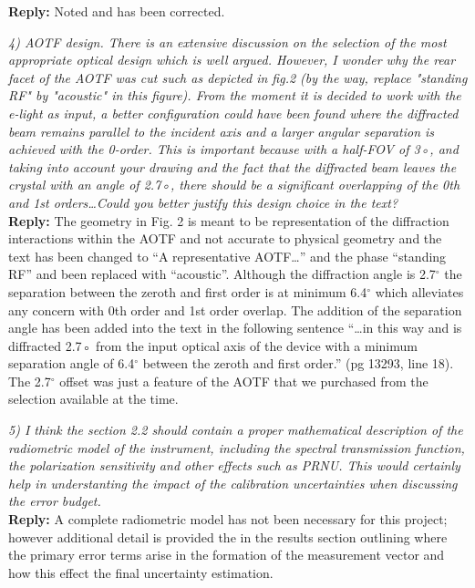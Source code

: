 \documentclass[12pt, notitlepage]{article}
\begin{document}
\textbf{Reply:} Noted and has been corrected.

\hrulefill

\textit{4) AOTF design. There is an extensive discussion on the selection of the most appropriate
optical design which is well argued. However, I wonder why the rear facet of the
AOTF was cut such as depicted in fig.2 (by the way, replace "standing RF" by "acoustic"
in this figure). From the moment it is decided to work with the e-light as input, a
better configuration could have been found where the diffracted beam remains parallel
to the incident axis and a larger angular separation is achieved with the 0-order. This is
important because with a half-FOV of 3◦, and taking into account your drawing and the
fact that the diffracted beam leaves the crystal with an angle of 2.7◦, there should be a
significant overlapping of the 0th and 1st orders\ldots Could you better justify this design
choice in the text?}\\

\textbf{Reply:} The geometry in Fig. 2 is meant to be representation of the diffraction interactions within the AOTF and not accurate to physical geometry and the text has been changed to ``A representative AOTF\ldots'' and the phase ``standing RF'' and been replaced with ``acoustic''. Although the diffraction angle is 2.7$^{\circ}$ the separation between the zeroth and first order is at minimum 6.4$^{\circ}$ which alleviates any concern with 0th order and 1st order overlap. The addition of the separation angle has been added into the text in the following sentence ``\ldots in this way and is diffracted 2.7◦ from the input optical axis of the device with a minimum separation angle of 6.4$^{\circ}$ between the zeroth and first order.'' (pg 13293, line 18). The 2.7$^{\circ}$ offset was just a feature of the AOTF that we purchased from the selection available at the time.

\hrulefill

\textit{5) I think the section 2.2 should contain a proper mathematical description of the radiometric
model of the instrument, including the spectral transmission function, the
polarization sensitivity and other effects such as PRNU. This would certainly help in
understanting the impact of the calibration uncertainties when discussing the error budget.}\\

\textbf{Reply:} A complete radiometric model has not been necessary for this project; however additional detail is provided the in the results section outlining where the primary error terms arise in the formation of the measurement vector and how this effect the final uncertainty estimation.
\end{document}

